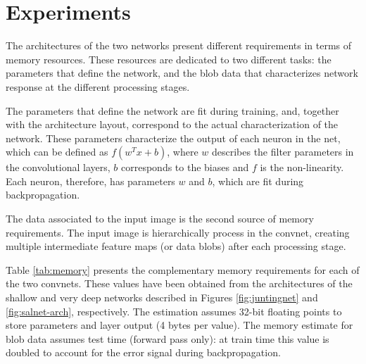 \documentclass[10pt,twocolumn,letterpaper]{article}
\begin{document}
\section{Experiments}\label{sec:experiments}%

The architectures of the two networks present different requirements in terms of memory resources.
These resources are dedicated to two different tasks: the parameters that define the network, and the blob data that characterizes network response at the different processing stages.

The parameters that define the network are fit during training, and, together with the architecture layout, correspond to the actual characterization of the network.
These parameters characterize the output of each neuron in the net, which can be defined as $f(w^T x+b)$, where $w$ describes the filter parameters in the convolutional layers, $b$ corresponds to the biases and $f$ is the non-linearity.
Each neuron, therefore, has parameters $w$ and $b$, which are fit during backpropagation.

The data associated to the input image is the second source of memory requirements.
The input image is hierarchically process in the convnet, creating multiple intermediate feature maps (or data blobs) after each processing stage.

Table \ref{tab:memory} presents the complementary memory requirements for each of the two convnets.
These values have been obtained from the architectures of the shallow and very deep networks described in Figures \ref{fig:juntingnet} and \ref{fig:salnet-arch}, respectively.
The estimation assumes 32-bit floating points to store parameters and layer output (4 bytes per value).
The memory estimate for blob data assumes test time (forward pass only):
at train time this value is doubled to account for the error signal during backpropagation.
\end{document}
